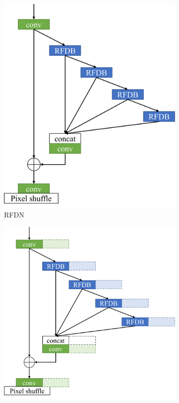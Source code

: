 \documentclass[10pt,twocolumn,letterpaper]{article}
\begin{document}
\begin{figure}
    \centering
    \begin{subfigure}[b]{0.49\linewidth}
		\centering
        \includegraphics[width=\textwidth]{../RFDN.pdf}
        \caption{RFDN}
        \label{fig:RFDN}
    \end{subfigure}
    \begin{subfigure}[b]{0.49\linewidth}
		\centering
        \includegraphics[width=\textwidth]{../expand.pdf}

\end{subfigure}
\end{figure}
\end{document}
